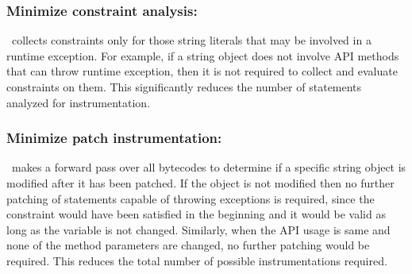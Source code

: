 \subsubsection{Minimize constraint analysis: }
\label{subsubsec:minimizeConstrintInstrumentation}
%
\tool\ collects constraints only for those string literals that may be involved
in a runtime exception. For example, if a string object does not involve API
methods that can throw runtime exception, then it is not required to collect and
evaluate constraints on them. This significantly reduces the number of
statements analyzed for instrumentation.
 


\subsubsection{Minimize patch instrumentation: }
\label{subsubsec:minimizePatchInstrumentation}
% 
\tool\ makes a forward pass over all bytecodes to determine if a specific string
object is modified after it has been patched. If the object is not modified then
no further patching of statements capable of throwing  exceptions is
required, since the constraint would have been satisfied in the beginning and it would be valid
as long as the variable is not changed. Similarly, when the API usage is same and none of 
the method parameters are changed, no further patching would be required. This reduces the 
total number of possible
instrumentations required. 